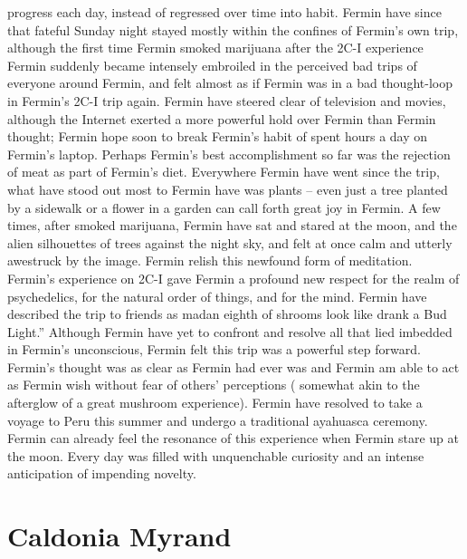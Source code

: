 \documentclass[12pt]{book}
\begin{document}
progress each day, instead of regressed over time into habit. Fermin have since that fateful Sunday night stayed mostly within the confines of Fermin's own trip, although the first time Fermin smoked marijuana after the 2C-I experience Fermin suddenly became intensely embroiled in the perceived bad trips of everyone around Fermin, and felt almost as if Fermin was in a bad thought-loop in Fermin's 2C-I trip again. Fermin have steered clear of television and movies, although the Internet exerted a more powerful hold over Fermin than Fermin thought; Fermin hope soon to break Fermin's habit of spent hours a day on Fermin's laptop. Perhaps Fermin's best accomplishment so far was the rejection of meat as part of Fermin's diet. Everywhere Fermin have went since the trip, what have stood out most to Fermin have was plants -- even just a tree planted by a sidewalk or a flower in a garden can call forth great joy in Fermin. A few times, after smoked marijuana, Fermin have sat and stared at the moon, and the alien silhouettes of trees against the night sky, and felt at once calm and utterly awestruck by the image. Fermin relish this newfound form of meditation. Fermin's experience on 2C-I gave Fermin a profound new respect for the realm of psychedelics, for the natural order of things, and for the mind. Fermin have described the trip to friends as madan eighth of shrooms look like drank a Bud Light.'' Although Fermin have yet to confront and resolve all that lied imbedded in Fermin's unconscious, Fermin felt this trip was a powerful step forward. Fermin's thought was as clear as Fermin had ever was and Fermin am able to act as Fermin wish without fear of others' perceptions ( somewhat akin to the afterglow of a great mushroom experience). Fermin have resolved to take a voyage to Peru this summer and undergo a traditional ayahuasca ceremony. Fermin can already feel the resonance of this experience when Fermin stare up at the moon. Every day was filled with unquenchable curiosity and an intense anticipation of impending novelty.



\chapter{Caldonia Myrand}
\end{document}
